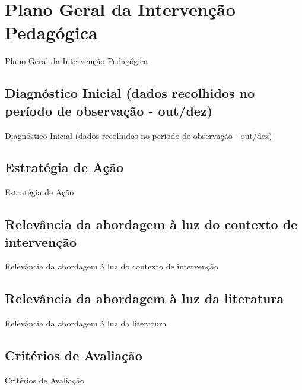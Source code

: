 \chapter{Plano Geral da Intervenção Pedagógica}

Plano Geral da Intervenção Pedagógica

\section{Diagnóstico Inicial (dados recolhidos no período de observação - out/dez)}

Diagnóstico Inicial (dados recolhidos no período de observação - out/dez)

\section{Estratégia de Ação}
Estratégia de Ação

\section{Relevância da abordagem à luz do contexto de intervenção}

Relevância da abordagem à luz do contexto de intervenção

\section{Relevância da abordagem à luz da literatura}
Relevância da abordagem à luz da literatura

\section{Critérios de Avaliação}

Critérios de Avaliação







